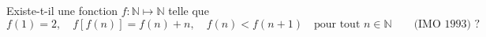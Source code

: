 Existe-t-il une fonction $f : \mathbb{N} \mapsto \mathbb{N}$ telle que
\[ f(1) = 2,\quad f[f(n)] = f(n) + n,\quad f(n) < f(n + 1) \quad\text{pour tout } n \in \mathbb{N} \qquad \text{(IMO 1993) ?} \]
